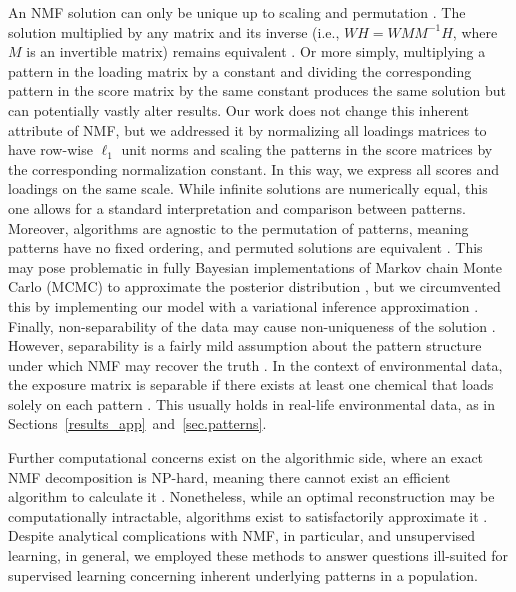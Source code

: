 An NMF solution can only be unique up to scaling and permutation \cite{eggert2004sparse}. The solution multiplied by any matrix and its inverse (i.e., $W H = W M M^{-1} H$, where $M$ is an invertible matrix) remains equivalent \cite{xu2003document}. Or more simply, multiplying a pattern in the loading matrix by a constant and dividing the corresponding pattern in the score matrix by the same constant produces the same solution but can potentially vastly alter results. Our work does not change this inherent attribute of NMF, but we addressed it by normalizing all loadings matrices to have row-wise $\ell_1$ unit norms and scaling the patterns in the score matrices by the corresponding normalization constant. In this way, we express all scores and loadings on the same scale. While infinite solutions are numerically equal, this one allows for a standard interpretation and comparison between patterns. Moreover, algorithms are agnostic to the permutation of patterns, meaning patterns have no fixed ordering, and permuted solutions are equivalent \cite{celeux1998bayesian}. This may pose problematic in fully Bayesian implementations of Markov chain Monte Carlo (MCMC) to approximate the posterior distribution \cite{bda3}, but we circumvented this by implementing our model with a variational inference approximation \cite{blei2017variational}. Finally, non-separability of the data may cause non-uniqueness of the solution \cite{laurberg2008theorems}. However, separability is a fairly mild assumption about the pattern structure under which NMF may recover the truth \cite{arora2016computing}. In the context of environmental data, the exposure matrix is separable if there exists at least one chemical that loads solely on each pattern \cite{arora2012learning}. This usually holds in real-life environmental data, as in Sections~\ref{results_app}~and~\ref{sec.patterns}.

Further computational concerns exist on the algorithmic side, where an exact NMF decomposition is NP-hard, meaning there cannot exist an efficient algorithm to calculate it \cite{vavasis2010complexity}. Nonetheless, while an optimal reconstruction may be computationally intractable, algorithms exist to satisfactorily approximate it \cite{gillis2020nonnegative}. Despite analytical complications with NMF, in particular, and unsupervised learning, in general, we employed these methods to answer questions ill-suited for supervised learning concerning inherent underlying patterns in a population.

